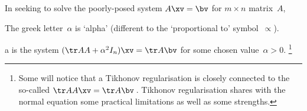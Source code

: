\begin{definition} \label{def:Tikreg}
In seeking to solve the poorly-posed system \(A\xv=\bv\) for \(m\times n\) matrix~\(A\), 
\begin{aside}
The greek letter~\(\alpha\) is `alpha' (different to the `proportional to' symbol~\(\propto\)).
\end{aside}%
a  is the system \((\tr AA+\alpha^2I_n)\xv=\tr A\bv\) for some chosen  value~\(\alpha>0\).
\footnote{Some will notice that a Tikhonov regularisation is closely connected to the so-called  \(\tr AA\xv=\tr A\bv\)\,.  
Tikhonov regularisation shares with the normal equation some practical limitations as well as some strengths.}
\end{definition}


